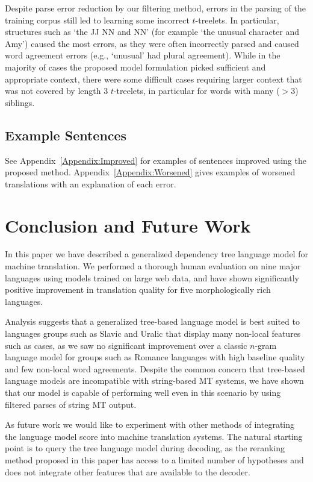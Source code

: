 \documentclass[english]{jnlp_1.4}
\begin{document}
Despite parse error reduction by our filtering method, errors in the parsing of the training corpus
still led to learning some incorrect $t$-treelets. In particular, structures such as `the JJ NN and NN'
(for example `the unusual character and Amy') caused the most errors, as they were often
incorrectly parsed and caused word agreement errors (e.g., `unusual' had plural agreement).
While in the majority of cases the proposed model formulation picked sufficient and appropriate context,
there were some difficult cases requiring larger context that was not covered by length 3 $t$-treelets,
in particular for words with many ($>3$) siblings.


\subsection{Example Sentences}

See Appendix~\ref{Appendix:Improved} for examples of sentences improved using the
proposed method. Appendix~\ref{Appendix:Worsened} gives examples of worsened
translations with an explanation of each error.


\section{Conclusion and Future Work}

In this paper we have described a generalized dependency tree language model
for machine translation. We performed a thorough human evaluation on
nine major languages using models trained on large web data, and have shown
significantly positive improvement in translation quality for five morphologically rich languages.

Analysis suggests that a generalized tree-based language model is best suited to languages groups such as Slavic and
Uralic that display many non-local features such as cases, as we saw no significant improvement over a classic $n$-gram language model
for groups such as Romance languages with high baseline quality and few non-local word agreements.
Despite the common concern that tree-based language models are incompatible
with string-based MT systems, we have shown that our model is capable of performing
well even in this scenario by using filtered parses of string MT output.

As future work we would like to experiment with other methods of integrating
the language model score into machine translation systems. The natural starting
point is to query the tree language model during decoding, as the reranking
method proposed in this paper has access to a limited number of hypotheses
and does not integrate other features that are available to the decoder.
\end{document}
